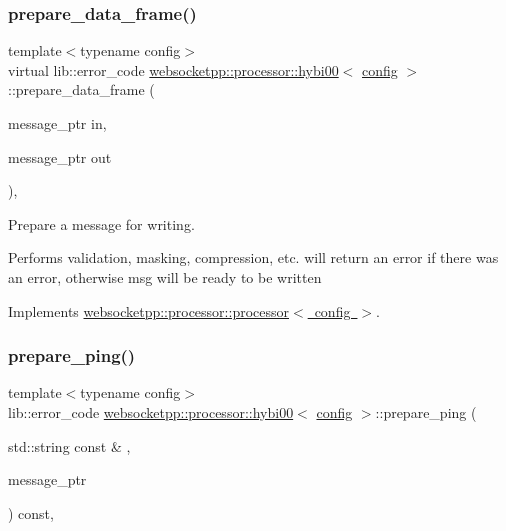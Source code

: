 \subsubsection{\texorpdfstring{prepare\+\_\+data\+\_\+frame()}{prepare\_data\_frame()}}
{\footnotesize\ttfamily template$<$typename config$>$ \\
virtual lib\+::error\+\_\+code \mbox{\hyperlink{classwebsocketpp_1_1processor_1_1hybi00}{websocketpp\+::processor\+::hybi00}}$<$ \mbox{\hyperlink{classconfig}{config}} $>$\+::prepare\+\_\+data\+\_\+frame (\begin{DoxyParamCaption}\item[{message\+\_\+ptr}]{in,  }\item[{message\+\_\+ptr}]{out }\end{DoxyParamCaption})\hspace{0.3cm}{\ttfamily [inline]}, {\ttfamily [virtual]}}



Prepare a message for writing. 

Performs validation, masking, compression, etc. will return an error if there was an error, otherwise msg will be ready to be written 

Implements \mbox{\hyperlink{classwebsocketpp_1_1processor_1_1processor_a1345763249867d742390aa8e2076cb70}{websocketpp\+::processor\+::processor$<$ config $>$}}.

\mbox{\label{classwebsocketpp_1_1processor_1_1hybi00_a19b26fd77f07fb74cf654c5c6976cac3}} 
\subsubsection{\texorpdfstring{prepare\+\_\+ping()}{prepare\_ping()}}
{\footnotesize\ttfamily template$<$typename config$>$ \\
lib\+::error\+\_\+code \mbox{\hyperlink{classwebsocketpp_1_1processor_1_1hybi00}{websocketpp\+::processor\+::hybi00}}$<$ \mbox{\hyperlink{classconfig}{config}} $>$\+::prepare\+\_\+ping (\begin{DoxyParamCaption}\item[{std\+::string const \&}]{,  }\item[{message\+\_\+ptr}]{ }\end{DoxyParamCaption}) const\hspace{0.3cm}{\ttfamily [inline]}, {\ttfamily [virtual]}}



